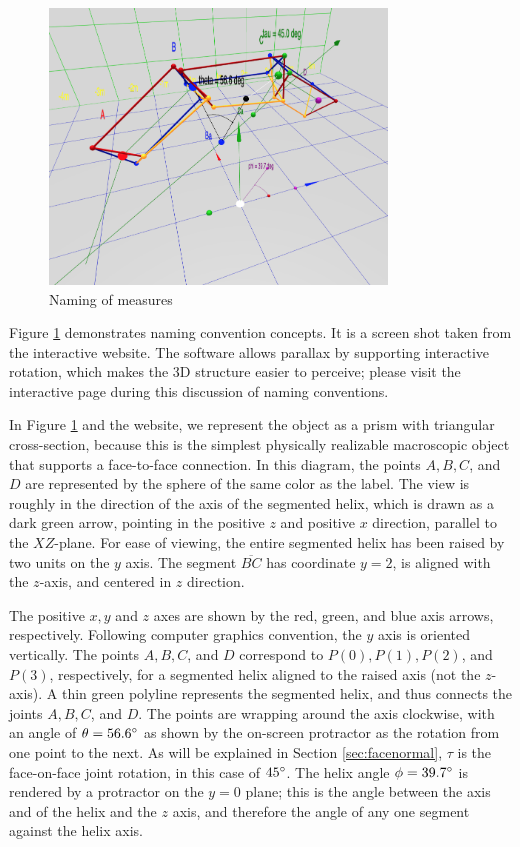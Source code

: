 \documentclass[11pt]{article}
\begin{document}
{\begin{figure}
     \centering
     \includegraphics[width=0.80\textwidth]{figures/ABCDFigure.png}
     \caption{Naming of measures}
  \label{fig:naming}
\end{figure}

Figure \ref{fig:naming} demonstrates naming convention concepts.
It is a screen shot taken from the interactive website\cite{segmentedhelixinteractive}.
The software allows parallax by supporting interactive rotation,
which makes the 3D structure easier to perceive;
please visit the interactive page during this discussion of naming conventions.

In Figure \ref{fig:naming} and the website, we represent the object as a prism
with triangular cross-section, because this is
the simplest physically realizable macroscopic object that supports a face-to-face connection.
In this diagram, the
points $A,B,C$, and $D$ are represented by the sphere of the same color as the label. The view is roughly in the direction of
the axis of the segmented helix, which is drawn as a dark green arrow, pointing in the positive $z$ and positive $x$ direction,
parallel to the $XZ$-plane.
For ease of viewing, the entire segmented helix has been raised by two units on the $y$ axis.
The segment $\overline{BC}$ has coordinate $y = 2$, is aligned with the $z$-axis, and centered in $z$ direction.

The positive $x,y$ and $z$ axes are shown by the red, green, and blue axis arrows, respectively.
Following computer graphics convention, the $y$ axis is oriented vertically.
The points $A,B,C$, and $D$ correspond to $P(0), P(1), P(2)$, and $ P(3)$, respectively,
for a segmented helix aligned
to the raised axis (not the $z$-axis).
A thin green polyline represents the segmented helix, and thus connects the joints $A,B,C$, and $D$.
The points are wrapping around the axis clockwise, with an angle of $\theta = 56.6 \degree$ as
shown by the on-screen protractor as the rotation from one point to the next. As will be explained in Section \ref{sec:facenormal},
$\tau$ is the face-on-face joint rotation, in this case of $45 \degree$.
The helix angle $\phi = 39.7 \degree$ is rendered by a protractor on the $y = 0$ plane;
this is the angle between the axis
and of the helix and the $z$ axis, and therefore the angle of any one segment against the helix axis.

}
\end{document}
